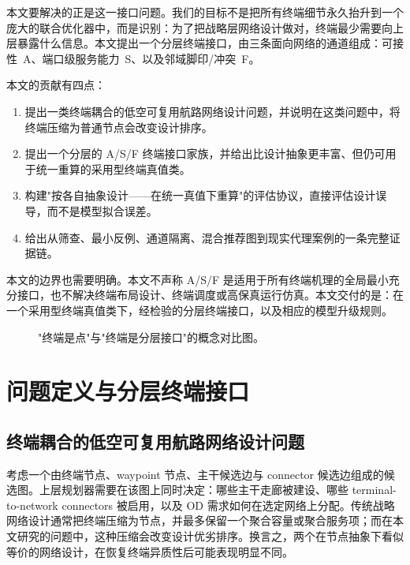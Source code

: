 \documentclass[review,authoryear]{elsarticle}
\begin{document}
本文要解决的正是这一接口问题。我们的目标不是把所有终端细节永久抬升到一个庞大的联合优化器中，而是识别：为了把战略层网络设计做对，终端最少需要向上层暴露什么信息。本文提出一个分层终端接口，由三条面向网络的通道组成：可接性~A、端口级服务能力~S、以及邻域脚印/冲突~F。

本文的贡献有四点：
\begin{enumerate}[label=(\roman*)]
  \item 提出一类终端耦合的低空可复用航路网络设计问题，并说明在这类问题中，将终端压缩为普通节点会改变设计排序。
  \item 提出一个分层的 A/S/F 终端接口家族，并给出比设计抽象更丰富、但仍可用于统一重算的采用型终端真值类。
  \item 构建"按各自抽象设计——在统一真值下重算"的评估协议，直接评估设计误导，而不是模型拟合误差。
  \item 给出从筛查、最小反例、通道隔离、混合推荐图到现实代理案例的一条完整证据链。
\end{enumerate}

本文的边界也需要明确。本文不声称 A/S/F 是适用于所有终端机理的全局最小充分接口，也不解决终端布局设计、终端调度或高保真运行仿真。本文交付的是：在一个采用型终端真值类下，经检验的分层终端接口，以及相应的模型升级规则。

\begin{figure}[htbp]
  \centering
  \caption{"终端是点"与"终端是分层接口"的概念对比图。}
  \label{fig:concept}
\end{figure}


\section{问题定义与分层终端接口}
\label{sec:problem}

\subsection{终端耦合的低空可复用航路网络设计问题}
\label{sec:problem:coupled}

考虑一个由终端节点、waypoint 节点、主干候选边与 connector 候选边组成的候选图。上层规划器需要在该图上同时决定：哪些主干走廊被建设、哪些 terminal-to-network connectors 被启用，以及 OD 需求如何在选定网络上分配。传统战略网络设计通常把终端压缩为节点，并最多保留一个聚合容量或聚合服务项；而在本文研究的问题中，这种压缩会改变设计优劣排序。换言之，两个在节点抽象下看似等价的网络设计，在恢复终端异质性后可能表现明显不同。
\end{document}
